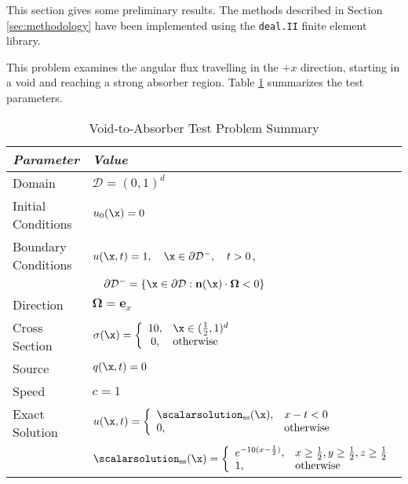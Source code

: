This section gives some preliminary results. The methods described
in Section \ref{sec:methodology} have been implemented using the
\texttt{deal.II} finite element library\cite{dealii}.

%

This problem examines the angular flux travelling in the $+x$ direction,
starting in a void and reaching a strong absorber region.
Table \ref{tab:void_to_absorber} summarizes the test parameters.

\begin{table}[htb]\caption{Void-to-Absorber Test Problem Summary}
\label{tab:void_to_absorber}
\centering
\begin{tabular}{l l}\toprule
\emph{Parameter} & \emph{Value}\\\midrule
Domain & $\mathcal{D} = (0,1)^d$\\
Initial Conditions & $u_0(\x)=0$\\
Boundary Conditions & $u(\x,t)=1,\quad \x\in\partial\mathcal{D}^-,\quad t>0$,\\
   & $\quad\partial\mathcal{D}^-=\{\x\in\partial\mathcal{D}:\mathbf{n}(\x)
       \cdot\mathbf{\Omega}<0\}$\\
Direction & $\mathbf{\Omega} = \mathbf{e}_x$\\
Cross Section & $\sigma(\x)=\left\{\begin{array}{c l}
   10, & \x\in(\frac{1}{2},1)^d\\
   0,  & \mbox{otherwise}\end{array}\right.$\\
Source & $q(\x,t)=0$\\
Speed & $c=1$\\
Exact Solution & $u(\x,t)=\left\{\begin{array}{l l}
   \scalarsolution_{\text{ss}}(\x), & x-t<0\\
   0, & \mbox{otherwise}
   \end{array}\right.$ \\
   & $\scalarsolution_{\text{ss}}(\x) =
       \left\{\begin{array}{l l}
          e^{-10(x-\frac{1}{2})}, & x\ge\frac{1}{2}, y\ge\frac{1}{2}, z\ge\frac{1}{2}\\
          1,                      & \mbox{otherwise}
       \end{array}\right.$\\
\bottomrule\end{tabular}
\end{table}

